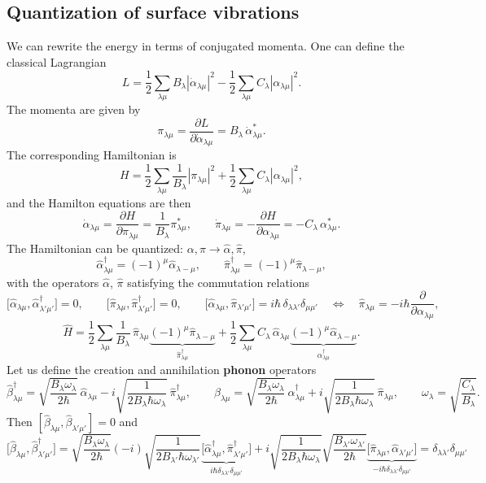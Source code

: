 \documentclass[11pt,a4paper]{article}
\newcommand{\op}[1]{\hat{#1}}
\begin{document}
\subsection{Quantization of surface vibrations}
We can rewrite the energy in terms of conjugated momenta. One can define the classical Lagrangian
\[
L=\frac12\sum_{\lambda\mu}B_\lambda|\dot\alpha_{\lambda\mu}|^2-\frac12\sum_{\lambda\mu}C_\lambda|\alpha_{\lambda\mu}|^2 .
\]
The momenta are given by
\[
\pi_{\lambda\mu}=\frac{\partial L}{\partial\dot\alpha_{\lambda\mu}}=B_\lambda\,\dot\alpha^*_{\lambda\mu}.
\]
The corresponding Hamiltonian is
\[
H=\frac12\sum_{\lambda\mu}\frac{1}{B_\lambda}|\pi_{\lambda\mu}|^2+\frac12\sum_{\lambda\mu}C_\lambda|\alpha_{\lambda\mu}|^2 ,
\]
and the Hamilton equations are then
\[
\dot\alpha_{\lambda\mu}=\frac{\partial H}{\partial\pi_{\lambda\mu}}=\frac{1}{B_\lambda}\pi^*_{\lambda\mu},\qquad
\dot\pi_{\lambda\mu}=-\frac{\partial H}{\partial\alpha_{\lambda\mu}}=-C_\lambda\,\alpha^*_{\lambda\mu}.
\]
The Hamiltonian can be quantized: $\alpha,\pi\to\op\alpha,\op\pi$,
\[
\op\alpha^\dagger_{\lambda\mu}=(-1)^\mu\op\alpha_{\lambda-\mu},\qquad \op\pi^\dagger_{\lambda\mu}=(-1)^\mu\op\pi_{\lambda-\mu},
\]
with the operators $\op\alpha$, $\op\pi$ satisfying the commutation relations
\[
\big[\op\alpha_{\lambda\mu},\op\alpha^\dagger_{\lambda'\mu'}\big]=0,\qquad
\big[\op\pi_{\lambda\mu},\op\pi^\dagger_{\lambda'\mu'}\big]=0,\qquad
\big[\op\alpha_{\lambda\mu},\op\pi_{\lambda'\mu'}\big]=i\hbar\,\delta_{\lambda\lambda'}\delta_{\mu\mu'}
\quad\Longleftrightarrow\quad \op\pi_{\lambda\mu}=-i\hbar\frac{\partial}{\partial\alpha_{\lambda\mu}},
\]
\[
\op H=\frac12\sum_{\lambda\mu}\frac{1}{B_\lambda}\,\op\pi_{\lambda\mu}\underbrace{(-1)^\mu\op\pi_{\lambda-\mu}}_{\op\pi^\dagger_{\lambda\mu}}
+\frac12\sum_{\lambda\mu}C_\lambda\,\op\alpha_{\lambda\mu}\underbrace{(-1)^\mu\op\alpha_{\lambda-\mu}}_{\op\alpha^\dagger_{\lambda\mu}} .
\]
Let us define the creation and annihilation \textbf{phonon} operators
\[
\op\beta^\dagger_{\lambda\mu}=\sqrt{\frac{B_\lambda\omega_\lambda}{2\hbar}}\,\op\alpha_{\lambda\mu}-i\sqrt{\frac{1}{2B_\lambda\hbar\omega_\lambda}}\,\op\pi^\dagger_{\lambda\mu},
\qquad
\op\beta_{\lambda\mu}=\sqrt{\frac{B_\lambda\omega_\lambda}{2\hbar}}\,\op\alpha^\dagger_{\lambda\mu}+i\sqrt{\frac{1}{2B_\lambda\hbar\omega_\lambda}}\,\op\pi_{\lambda\mu},
\qquad \omega_\lambda=\sqrt{\frac{C_\lambda}{B_\lambda}} .
\]
Then $[\op\beta_{\lambda\mu},\op\beta_{\lambda'\mu'}]=0$ and
\[
\big[\op\beta_{\lambda\mu},\op\beta^\dagger_{\lambda'\mu'}\big]
=\sqrt{\frac{B_\lambda\omega_\lambda}{2\hbar}}(-i)\sqrt{\frac{1}{2B_{\lambda'}\hbar\omega_{\lambda'}}}\underbrace{\big[\op\alpha^\dagger_{\lambda\mu},\op\pi^\dagger_{\lambda'\mu'}\big]}_{i\hbar\delta_{\lambda\lambda'}\delta_{\mu\mu'}}
+i\sqrt{\frac{1}{2B_\lambda\hbar\omega_\lambda}}\sqrt{\frac{B_{\lambda'}\omega_{\lambda'}}{2\hbar}}\underbrace{\big[\op\pi_{\lambda\mu},\op\alpha_{\lambda'\mu'}\big]}_{-i\hbar\delta_{\lambda\lambda'}\delta_{\mu\mu'}}
=\delta_{\lambda\lambda'}\delta_{\mu\mu'}
\]
\end{document}
